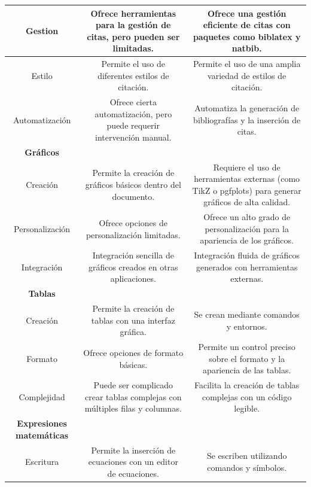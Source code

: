\documentclass[10pt,twocolumn,a4paper]{article}
\begin{document}
\begin{table}[h!]
{\begin{tabular}{|c|c|c|}
            {Gestion}         & Ofrece herramientas para la gestión de citas, pero pueden ser limitadas.          & Ofrece una gestión eficiente de citas con paquetes como biblatex y natbib.                 \\ \hline
            {Estilo}          & Permite el uso de diferentes estilos de citación.          & Permite el uso de una amplia variedad de estilos de citación.\\ \hline
            {Automatización}  & Ofrece cierta automatización, pero puede requerir intervención manual.          & Automatiza la generación de bibliografías y la inserción de citas.                \\ \hline
            \textbf{Gráficos}        &         &                   \\ \hline
            {Creación}        & Permite la creación de gráficos básicos dentro del documento.          & Requiere el uso de herramientas externas (como TikZ o pgfplots) para generar gráficos de alta calidad.                \\ \hline
            {Personalización} & Ofrece opciones de personalización limitadas.          & Ofrece un alto grado de personalización para la apariencia de los gráficos.\\ \hline
            {Integración}     & Integración sencilla de gráficos creados en otras aplicaciones.          & Integración fluida de gráficos generados con herramientas externas.              \\ \hline
            \textbf{Tablas}          &         &                   \\ \hline
            {Creación}        & Permite la creación de tablas con una interfaz gráfica.        & Se crean mediante comandos y entornos.                \\ \hline
            {Formato}         & Ofrece opciones de formato básicas.          & Permite un control preciso sobre el formato y la apariencia de las tablas.\\ \hline
            {Complejidad}     & Puede ser complicado crear tablas complejas con múltiples filas y columnas.          & Facilita la creación de tablas complejas con un código legible.              \\ \hline
            \textbf{Expresiones matemáticas}          &         &                   \\ \hline
            {Escritura}        & Permite la inserción de ecuaciones con un editor de ecuaciones.        & Se escriben utilizando comandos y símbolos.                \\ \hline

\end{tabular}}
\end{table}
\end{document}
